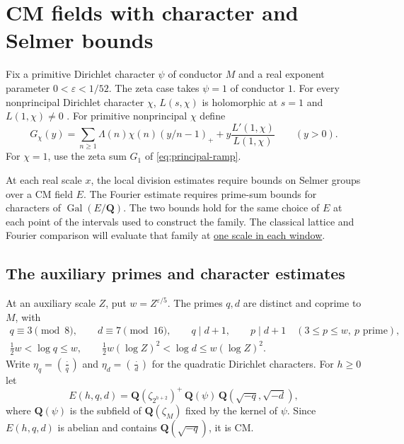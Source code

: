 \section{CM fields with character and Selmer bounds}
\label{sec:family}

Fix a primitive Dirichlet character \(\psi\) of conductor \(M\) and a
real exponent parameter \(0<\varepsilon<1/52\). The zeta case takes
\(\psi=1\) of conductor \(1\). For every nonprincipal Dirichlet
character \(\chi\), \(L(s,\chi)\) is holomorphic at \(s=1\) and
\(L(1,\chi)\ne0\) \cite[\S25.15(i) and (25.15.9)]{dlmf}. For
primitive nonprincipal \(\chi\) define
\begin{equation}
\label{eq:centred-prime-sums}
  G_\chi(y)=\sum_{n\ge1}\Lambda(n)\chi(n)(y/n-1)_+
                  +y\frac{L'(1,\chi)}{L(1,\chi)}
  \qquad(y>0).
\end{equation}
For \(\chi=1\), use the zeta sum \(G_1\) of \eqref{eq:principal-ramp}.

At each real scale \(x\), the local division estimates require bounds
on Selmer groups over a CM field \(E\). The Fourier estimate requires
prime-sum bounds for characters of \(\operatorname{Gal}(E/\mathbf Q)\).
The two bounds hold for the same choice of \(E\) at each point
of the intervals used to construct the family. The classical
lattice and Fourier comparison will evaluate that family at
\hyperlink{proof.classical-window-test-scale}{one scale in each window}.

\subsection{The auxiliary primes and character estimates}

At an auxiliary scale \(Z\), put \(w=Z^{\varepsilon/5}\). The primes
\(q,d\) are distinct and coprime to \(M\), with
\[
\begin{gathered}
 q\equiv3\pmod 8,\qquad d\equiv7\pmod {16},\qquad
 q\mid d+1,\qquad p\mid d+1\quad(3\le p\le w,\ p\text{ prime}),\\
 \tfrac12w<\log q\le w,\qquad
 \tfrac12w(\log Z)^2<\log d\le w(\log Z)^2 .
\end{gathered}
\]
Write \(\eta_q=(\frac{\cdot}{q})\) and \(\eta_d=(\frac{\cdot}{d})\) for
the quadratic Dirichlet characters. For \(h\ge0\) let
\[
 E(h,q,d)=\mathbf Q(\zeta_{2^{h+2}})^+\,\mathbf Q(\psi)\,
              \mathbf Q(\sqrt{-q},\sqrt{-d}),
\]
where \(\mathbf Q(\psi)\) is the subfield of \(\mathbf Q(\zeta_M)\)
fixed by the kernel of \(\psi\). Since \(E(h,q,d)\) is abelian and
contains \(\mathbf Q(\sqrt{-q})\), it is CM.

